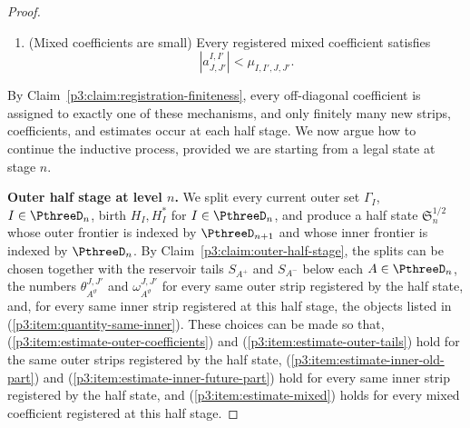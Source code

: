 \documentclass[11pt,reqno]{amsart}
\makeatletter
\theoremstyle{plain}
\theoremstyle{definition}
\newcounter{problempaper}
\newenvironment{problempaperbody}{%
  \setcounter{subsection}{0}%
  \setcounter{subsubsection}{0}%
  \setcounter{paragraph}{0}%
  \renewcommand{\thesubsection}{\arabic{subsection}}%
  \renewcommand{\thesubsubsection}{\thesubsection.\arabic{subsubsection}}%
  \renewcommand{\theparagraph}{\thesubsubsection.\arabic{paragraph}}%
  \let\problem@outersection\section
  \let\problem@outersubsection\subsection
  \let\problem@outersubsubsection\subsubsection
  \let\problem@outerparagraph\paragraph
  \let\section\problem@papersection
  \let\subsection\problem@papersubsection
  \let\subsubsection\problem@papersubsubsection
}{%
  \let\section\problem@outersection
  \let\subsection\problem@outersubsection
  \let\subsubsection\problem@outersubsubsection
  \let\paragraph\problem@outerparagraph
}
\newcommand{\problem@target}[2]{%
  \hypertarget{problem-\theproblempaper-#1-#2}{}%
}
\newcommand{\problem@paperheading}[3]{%
  \par\bigskip
  \problem@target{#1}{#2}%
  \noindent{\large\bfseries #2.\quad #3\par}%
  \nobreak\smallskip
}
\newcommand{\problem@papersubheading}[3]{%
  \par\medskip
  \problem@target{#1}{#2}%
  \noindent{\normalsize\bfseries #2.\quad #3\par}%
  \nobreak\smallskip
}
\newcommand{\problem@papersubsubheading}[3]{%
  \par\smallskip
  \problem@target{#1}{#2}%
  \noindent{\normalsize\itshape #2.\quad #3.\ }%
}
\def\problem@papersection{%
  \@ifstar{\problem@papersectionstar}{\problem@papersectionnostar}%
}
\def\problem@papersectionstar#1{%
  \par\bigskip\noindent{\large\bfseries #1\par}\nobreak\smallskip
}
\def\problem@papersectionnostar#1{%
  \refstepcounter{subsection}%
  \setcounter{subsubsection}{0}%
  \setcounter{paragraph}{0}%
  \problem@paperheading{section}{\thesubsection}{#1}%
  \problem@writecontentsline{section}{\thesubsection}{#1}%
}
\def\problem@papersubsection{%
  \@ifstar{\problem@papersubsectionstar}{\problem@papersubsectionnostar}%
}
\def\problem@papersubsectionstar#1{%
  \par\medskip\noindent{\normalsize\bfseries #1\par}\nobreak\smallskip
}
\def\problem@papersubsectionnostar#1{%
  \refstepcounter{subsubsection}%
  \setcounter{paragraph}{0}%
  \problem@papersubheading{subsection}{\thesubsubsection}{#1}%
  \problem@writecontentsline{subsection}{\thesubsubsection}{#1}%
}
\def\problem@papersubsubsection{%
  \@ifstar{\problem@papersubsubsectionstar}{\problem@papersubsubsectionnostar}%
}
\def\problem@papersubsubsectionstar#1{%
  \par\smallskip\noindent{\normalsize\itshape #1.\ }%
}
\def\problem@papersubsubsectionnostar#1{%
  \refstepcounter{paragraph}%
  \problem@papersubsubheading{subsubsection}{\theparagraph}{#1}%
  \problem@writecontentsline{subsubsection}{\theparagraph}{#1}%
}
\newcommand{\problem@writecontentsline}[3]{%
  \begingroup
  \protected@write\@auxout{}{%
    \string\problemcontentsentry{\theproblempaper}{#1}{#2}{#3}{\thepage}%
  }%
  \endgroup
}
\newcommand{\problemcontentsentry}[5]{%
  \@ifundefined{problemcontents@#1}{%
    \expandafter\gdef\csname problemcontents@#1\endcsname{}%
  }{}%
  \expandafter\g@addto@macro\csname problemcontents@#1\endcsname{%
    \problemcontentsline{#1}{#2}{#3}{#4}{#5}%
  }%
}
\newcommand{\problemcontentslink}[4]{%
  \hyperlink{problem-#1-#2-#3}{#4}%
}
\newcommand{\problemcontentsline}[5]{%
  \ifstrequal{#2}{section}{%
    \par\noindent
    \problemcontentslink{#1}{#2}{#3}{\makebox[2.5em][l]{#3}#4}%
    \nobreak\dotfill
    \problemcontentslink{#1}{#2}{#3}{#5}\par
  }{%
    \ifstrequal{#2}{subsection}{%
      \par\noindent\hspace*{1.5em}%
      \problemcontentslink{#1}{#2}{#3}{\makebox[3.5em][l]{#3}#4}%
      \nobreak\dotfill
      \problemcontentslink{#1}{#2}{#3}{#5}\par
    }{%
      \par\noindent\hspace*{3em}%
      \problemcontentslink{#1}{#2}{#3}{\makebox[4.5em][l]{#3}#4}%
      \nobreak\dotfill
      \problemcontentslink{#1}{#2}{#3}{#5}\par
    }%
  }%
}
\makeatother
\begin{document}
\begin{problempaperbody}
\begin{proof}
\begin{enumerate}[label=\textup{(E\arabic*)},ref=E\arabic*]
\begin{equation}
\label{p3:eq:same-inner-edge-estimate}
        |\lambda_{\Delta_{C'}}(R_{I,I'})-\lambda_{\Delta_C}(R_{I,I'})|<\rho_{C,C'}^{I,I'}.
\end{equation}
Thus \textup{(\ref{p3:item:estimate-inner-old-part})} controls the part of the strip present at registration, while \textup{(\ref{p3:item:estimate-inner-future-part})} controls the coefficients born after registration.
\item\label{p3:item:estimate-mixed} (Mixed coefficients are small) Every registered mixed coefficient satisfies
\begin{equation}
\label{p3:eq:mixed-coefficient-estimate}
        |a_{J,J'}^{I,I'}|<\mu_{I,I',J,J'}.
\end{equation}
\end{enumerate}
By Claim~\ref{p3:claim:registration-finiteness}, every off-diagonal coefficient is assigned to exactly one of these mechanisms, and only finitely many new strips, coefficients, and estimates occur at each half stage. We now argue how to continue the inductive process, provided we are starting from a legal state at stage $n$.

\medskip
\noindent\textbf{Outer half stage at level $n$.} We split every current outer set $\Gamma_I$, $I\in\PthreeD_n$, birth $H_I,H_I^*$ for $I\in\PthreeD_n$, and produce a half state $\mathfrak S_n^{1/2}$ whose outer frontier is indexed by $\PthreeD_{n+1}$ and whose inner frontier is indexed by $\PthreeD_n$. By Claim~\ref{p3:claim:outer-half-stage}, the splits can be chosen together with the reservoir tails $S_{A^+}$ and $S_{A^-}$ below each $A\in\PthreeD_n$, the numbers $\theta_{A^\vartheta}^{J,J'}$ and $\omega_{A^\vartheta}^{J,J'}$ for every same outer strip registered by the half state, and, for every same inner strip registered at this half stage, the objects listed in \textup{(\ref{p3:item:quantity-same-inner})}. These choices can be made so that, \textup{(\ref{p3:item:estimate-outer-coefficients})} and \textup{(\ref{p3:item:estimate-outer-tails})} hold for the same outer strips registered by the half state, \textup{(\ref{p3:item:estimate-inner-old-part})} and \textup{(\ref{p3:item:estimate-inner-future-part})} hold for every same inner strip registered by the half state, and \textup{(\ref{p3:item:estimate-mixed})} holds for every mixed coefficient registered at this half stage.


\end{proof}
\end{problempaperbody}
\end{document}
